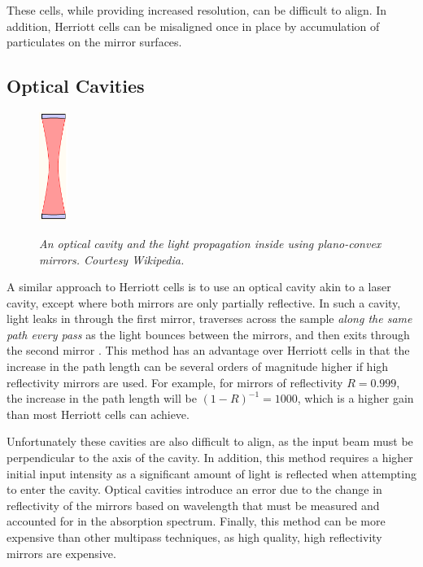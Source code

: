 These cells, while providing increased resolution, can be difficult to align.
In addition, Herriott cells can be misaligned once in place by accumulation of
particulates on the mirror surfaces.



\subsection{Optical Cavities}\label{subsec:cavity}


\begin{figure}
\begin{center}
  \includegraphics[height=100pt]{figures/cavity.png}
\end{center}
\emph{\footnotesize{An optical cavity and the light propagation inside using plano-convex mirrors. Courtesy Wikipedia.}}
\end{figure}

A similar approach to  Herriott cells is to use an optical cavity akin to a
laser cavity, except where both mirrors are only partially reflective. In such
a cavity, light leaks in through the first mirror, traverses across the sample
\emph{along the same path every pass} as the light bounces between the mirrors,
and then exits through the second mirror \cite{Berden:2009wk}. This method has an advantage over
Herriott cells in that the increase in the path length can be several orders of
magnitude higher if high reflectivity mirrors are used. For example, for
mirrors of reflectivity $R=0.999$, the increase in the path length will be
$(1-R)^{-1} = 1000$, which is a higher gain than most Herriott cells can
achieve.

Unfortunately these cavities are also difficult to align, as the input beam
must be perpendicular to the axis of the cavity. In addition, this method
requires a higher initial input intensity as a significant amount of light is
reflected when attempting to enter the cavity. Optical cavities introduce an
error due to the change in reflectivity of the mirrors based on wavelength that
must be measured and accounted for in the absorption spectrum. Finally, this
method can be more expensive than other multipass techniques, as high quality,
high reflectivity mirrors are expensive.

